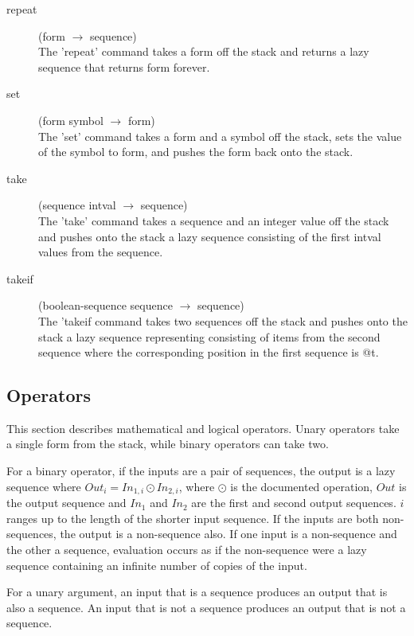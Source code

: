 \documentclass[12pt]{article}
\newcommand{\stackcmd}[3]{\item[{#1}] \hfill ({#2} $\rightarrow{}$ {#3}) \\}
\begin{document}
\begin{description}
\stackcmd{repeat}{form}{sequence}  The 'repeat' command takes a form
off the stack and returns a lazy sequence that returns form forever.

\stackcmd{set}{form symbol}{form}  The 'set' command takes a form and
a symbol off the stack, sets the value of the symbol to form, and
pushes the form back onto the stack.

\stackcmd{take}{sequence intval}{sequence}  The 'take' command takes a
sequence and an integer value off the stack and pushes onto the stack
a lazy sequence consisting of the first intval values from the
sequence.

\stackcmd{takeif}{boolean-sequence sequence}{sequence}  The 'takeif
command takes two sequences off the stack and pushes onto the stack a
lazy sequence representing consisting of items from the second
sequence where the corresponding position in the first sequence is
@t.

\end{description}

\subsection*{Operators}

This section describes mathematical and logical operators.  Unary
operators take a single form from the stack, while binary
operators can take two.

For a binary operator, if the inputs are a pair of sequences, the
output is a lazy sequence where $Out_i = In_{1,i} \odot In_{2,i}$,
where $\odot$ is the documented operation, $Out$ is the output
sequence and $In_{1}$ and $In_{2}$ are the first and second output
sequences. $i$ ranges up to the length of the shorter input sequence.
If the inputs are both non-sequences, the output is a non-sequence
also.  If one input is a non-sequence and the other a sequence,
evaluation occurs as if the non-sequence were a lazy sequence
containing an infinite number of copies of the input.

For a unary argument, an input that is a sequence produces an output
that is also a sequence.  An input that is not a sequence produces an
output that is not a sequence.
\end{document}
